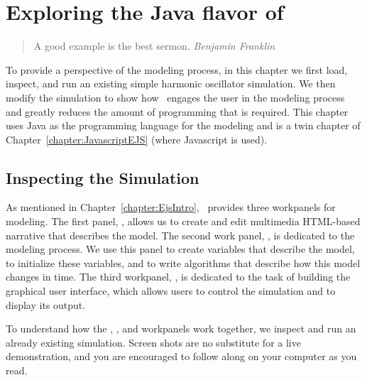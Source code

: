 
\chapter{Exploring the Java flavor of \Ejs}\label{chapter:JavaEJS}

\begin{quote}
A good example is the best sermon.  {\em Benjamin Franklin}
\end{quote}

To  provide a perspective of the modeling process, in this chapter we first load, inspect, and run an existing simple harmonic oscillator simulation. We then modify the simulation to show how \ejs\ engages the user in the modeling process and greatly reduces the amount of
programming that is required. This chapter uses Java as the programming language for the modeling and is a twin chapter of Chapter~\ref{chapter:JavascriptEJS} (where Javascript is used).

    \section{Inspecting the Simulation}\label{section:02ExplorationJavaInspecting}

As mentioned in Chapter~\ref{chapter:EjsIntro}, \Ejs\ provides three workpanels for modeling. The first panel, , allows us to create and edit multimedia HTML-based narrative that describes the model. 
The second work panel, , is dedicated to the modeling process. We use this panel to create
variables that describe the model, to initialize these variables, and to write algorithms that describe how this model
changes in time. The third workpanel, , is dedicated to the task of building the graphical user interface,
which allows users to control the simulation and to display its output.  

To understand how the , , and  workpanels work together, we inspect and run an
already existing simulation. Screen shots are no substitute for a live demonstration, and you are encouraged to follow along on your computer as you read.

